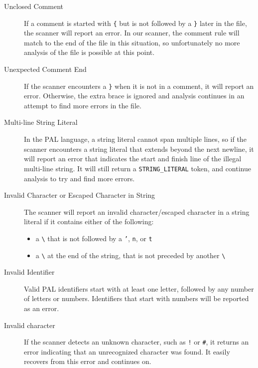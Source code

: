 \documentclass{article}
\begin{document}
\begin{description}
  \item[Unclosed Comment]
	  If a comment is started with \texttt{\{} but is not followed by a
	  \texttt{\}} later in the file, the scanner will report an error.  In
	  our scanner, the comment rule will match to the end of the file in
	  this situation, so unfortunately no more analysis of the file is
	  possible at this point.

  \item[Unexpected Comment End]
	  If the scanner encounters a \texttt{\}} when it is not in a comment,
	  it will report an error. Otherwise, the extra brace is ignored and analysis 
	  continues in an attempt to find more errors in the file.

  \item[Multi-line String Literal]
	  In the PAL language, a string literal cannot span multiple lines, so 
	  if the scanner encounters a string literal that extends beyond the next
	  newline, it will report an error that indicates the start and finish line
	  of the illegal multi-line string. It will still return a \texttt{STRING\_LITERAL}
	  token, and continue analysis to try and find more errors.

  \item[Invalid Character or Escaped Character in String]
	  The scanner will report an invalid character/escaped character in a string
	  literal if it contains either of the following:
	  \begin{itemize}
		  \item a \texttt{\textbackslash} that is not followed by a 
			  \texttt{'}, \texttt{n}, or \texttt{t}
		  \item a \texttt{\textbackslash} at the end of the string, that
			  is not preceded by another \texttt{\textbackslash}
	  \end{itemize}



  \item[Invalid Identifier]
	  Valid PAL identifiers start with at least one letter, followed by any number
	  of letters or numbers. Identifiers that start with numbers will be reported
	  as an error. 

  \item[Invalid character]
	  If the scanner detects an unknown character, such as \texttt{!} or
   \texttt{\#}, it returns an error indicating that an unrecognized
   character was found. It easily recovers from this error and
   continues on. 


\end{description}
\end{document}
